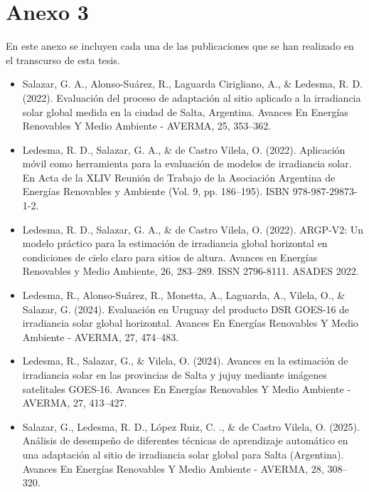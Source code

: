 \rhead{\newtitle}
\cfoot{\thepage}
\renewcommand{\headrulewidth}{1pt}
\renewcommand{\footrulewidth}{1pt}
\chapter*{Anexo 3}
\noindent En este anexo se incluyen cada una de las publicaciones que se han realizado en el transcurso de esta tesis.

\begin{itemize}
\item Salazar, G. A., Alonso-Suárez, R., Laguarda Cirigliano, A., \& Ledesma, R. D. (2022). Evaluación del proceso de adaptación al sitio aplicado a la irradiancia solar global medida en la ciudad de Salta, Argentina. Avances En Energías Renovables Y Medio Ambiente - AVERMA, 25, 353–362. 
\item Ledesma, R. D., Salazar, G. A., \& de Castro Vilela, O. (2022). Aplicación móvil como herramienta para la evaluación de modelos de irradiancia solar. En Acta de la XLIV Reunión de Trabajo de la Asociación Argentina de Energías Renovables y Ambiente (Vol. 9, pp. 186–195). ISBN 978-987-29873-1-2.

\item Ledesma, R. D., Salazar, G. A., \& de Castro Vilela, O. (2022). ARGP-V2: Un modelo práctico para la estimación de irradiancia global horizontal en condiciones de cielo claro para sitios de altura. Avances en Energías Renovables y Medio Ambiente, 26, 283–289. ISSN 2796-8111. ASADES 2022.

\item Ledesma, R., Alonso-Suárez, R., Monetta, A., Laguarda, A., Vilela, O., \& Salazar, G. (2024). Evaluación en Uruguay del producto DSR GOES-16 de irradiancia solar global horizontal. Avances En Energías Renovables Y Medio Ambiente - AVERMA, 27, 474–483.

\item Ledesma, R., Salazar, G., \& Vilela, O. (2024). Avances en la estimación de irradiancia solar en las provincias de Salta y jujuy mediante imágenes satelitales GOES-16. Avances En Energías Renovables Y Medio Ambiente - AVERMA, 27, 413–427.

\item Salazar, G., Ledesma, R. D., López Ruiz, C. ., \& de Castro Vilela, O. (2025). Análisis de desempeño de diferentes técnicas de aprendizaje automático en una adaptación al sitio de irradiancia solar global para Salta (Argentina). Avances En Energías Renovables Y Medio Ambiente - AVERMA, 28, 308–320.


\end{itemize}
